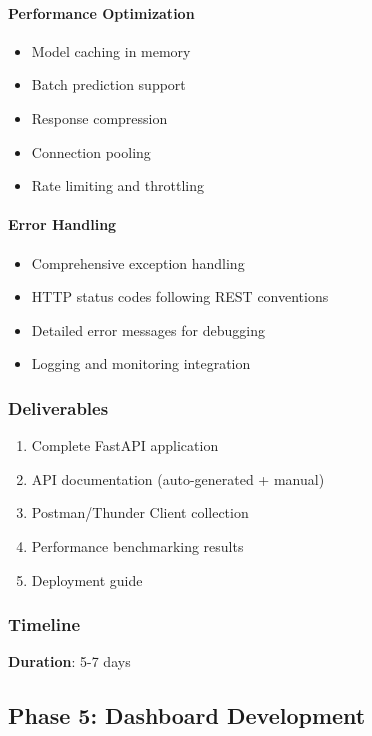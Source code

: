 \documentclass[12pt,a4paper]{article}
\begin{document}
\paragraph{Performance Optimization}
\begin{itemize}[leftmargin=*]
    \item Model caching in memory
    \item Batch prediction support
    \item Response compression
    \item Connection pooling
    \item Rate limiting and throttling
\end{itemize}

\paragraph{Error Handling}
\begin{itemize}[leftmargin=*]
    \item Comprehensive exception handling
    \item HTTP status codes following REST conventions
    \item Detailed error messages for debugging
    \item Logging and monitoring integration
\end{itemize}

\subsubsection{Deliverables}
\begin{enumerate}
    \item Complete FastAPI application
    \item API documentation (auto-generated + manual)
    \item Postman/Thunder Client collection
    \item Performance benchmarking results
    \item Deployment guide
\end{enumerate}

\subsubsection{Timeline}
\textbf{Duration}: 5-7 days

\newpage

\subsection{Phase 5: Dashboard Development}
\end{document}
